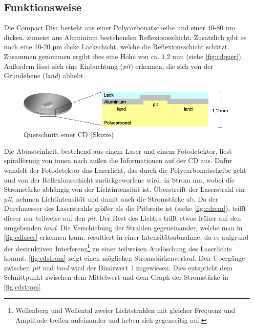 \subsection{Funktionsweise}
\label{subsec:cdfunktionsweise}

Die Compact Disc besteht aus einer Polycarbonatscheibe und einer 40-80 nm
dicken. zumeist aus Aluminium bestehenden Reflexionsschicht. Zusätzlich gibt es
noch eine 10-20 µm dicke Lackschicht, welche die Reflexionsschicht schützt.
Zusammen genommen ergibt dies eine Höhe von ca. 1,2 mm (siehe
\autoref{fig:cdquer}). Außerdem lässt sich eine Einbuchtung (\textit{pit})
erkennen, die sich von der Grundebene (\textit{land}) abhebt. \cite{cfcd}

\begin{figure}[h]
    \begin{center}
        \begin{minipage}[t]{\textwidth}
            \begin{center}
                \includegraphics[height=0.1\textheight]{Bilder/Optische_Datentraeger_Die_Compact_Disc/Funktionsweise/cdquer.png}
                \caption[Querschnitt einer CD (Skizze) \newline \url{http://daten.didaktikchemie.uni-bayreuth.de/umat/cd_dvd/cd_dvd.htm} (zuletzt aufgerufen am 07.08.2015)]{Querschnitt einer CD (Skizze)}
                \label{fig:cdquer}
            \end{center}
        \end{minipage}
    \end{center}
\end{figure}

Die Abtasteinheit, bestehend aus einem Laser und einem Fotodetektor, liest
spiralförmig von innen nach außen die Informationen auf der CD aus. Dafür
wandelt der Fotodetektor das Laserlicht, das durch die Polycarbonatscheibe geht
und von der Reflexionsschicht zurückgeworfene wird, in Strom um, wobei die
Stromstärke abhängig von der Lichtintensität ist. Überstreift der
Laserstrahl ein \textit{pit}, nehmen Lichtintensität und damit auch die
Stromstärke ab. Da der Durchmesser des Laserstrahls größer als die Pitbreite
ist (siehe \autoref{fig:cdrem}), trifft dieser nur teilweise auf den
\textit{pit}. Der Rest des Lichtes trifft etwas früher auf den umgebenden
\textit{land}. Die Verschiebung der Strahlen gegeneinander, welche man in
\autoref{fig:cdlaser} erkennen kann, resultiert in einer Intensitätsabnahme, da
es aufgrund der destruktiven Interferenz\footnote{Wellenberg und Wellental
zweier Lichtstrahlen mit gleicher Frequenz und Amplitude treffen aufeinander und
heben sich gegenseitig auf.} zu einer teilweisen Auslöschung des Laserlichts
kommt. \autoref{fig:cdstrom} zeigt einen möglichen Stromstärkenverlauf. Den
Übergänge zwischen \textit{pit} und \textit{land} wird der Binärwert 1
zugewiesen. Dies entspricht dem Schnittpunkt zwischen dem Mittelwert und dem
Graph der Stromstärke in \autoref{fig:cdstrom}. \cite{cdp}

